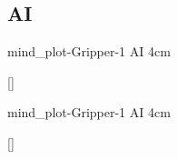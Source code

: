 {\newpage
  \noindent\begin{minipage}{\textwidth}
    \subsection{AI}
    \experimentcausegroupplots{\dataappendixmaxtime}
                              {\dataappendixexperimentonemaxtime}
                              {\dataappendixexperimenttwomaxtime}
                              {\dataappendixexperimentthreemaxtime}
                              {\dataappendixexperimentonename}
                              {\dataappendixexperimenttwoname}
                              {\dataappendixexperimentthreename}
                              {\dataappendixexperimentoneprettyname}
                              {\dataappendixexperimenttwoprettyname}
                              \experimentcausegroupplotscontinued{\dataappendixexperimentthreeprettyname}
                                                                 {mind_plot-Gripper-1}
                                                                 {AI}
                                                                 {\experimentdatacommontablereference}
                                                                 {4cm}
    \experimentdatablocksworldexample
    
    []{}
  \label{figure:mind_plot-Gripper-1}
  \end{minipage}
  
  \noindent\begin{minipage}{\textwidth}
    \experimentcausegroupplotstwo{\dataappendixmaxtime}
                                 {\dataappendixexperimentonemaxtime}
                                 {\dataappendixexperimenttwomaxtime}
                                 {\dataappendixexperimentthreemaxtime}
                                 {\dataappendixexperimentonename}
                                 {\dataappendixexperimenttwoname}
                                 {\dataappendixexperimentthreename}
                                 {\dataappendixexperimentoneprettyname}
                                 {\dataappendixexperimenttwoprettyname}
                                 \experimentcausegroupplotstwocontinued{\dataappendixexperimentthreeprettyname}
                                                                       {mind_plot-Gripper-1}
                                                                       {AI}
                                                                       {\experimentdatacommontablereference}
                                                                       {4cm}
    \experimentdatablocksworldexample

    []{}
  \label{figure:mind_plot-Gripper-1}
  \end{minipage}
}
